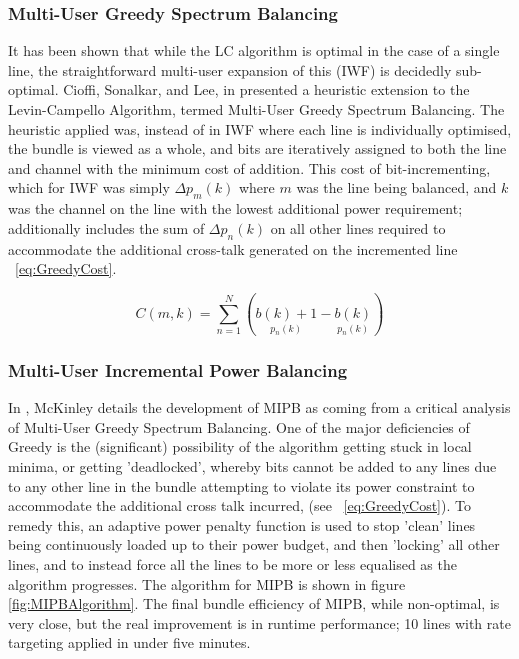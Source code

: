 \subsubsection{Multi-User Greedy Spectrum Balancing}
It has been shown that while the LC algorithm is optimal in the case of a single line, the straightforward multi-user expansion of this (IWF) is decidedly sub-optimal. Cioffi, Sonalkar, and Lee, in \cite{JL05} presented a heuristic extension to the Levin-Campello Algorithm, termed Multi-User Greedy Spectrum Balancing. 
The heuristic applied was, instead of in IWF where each line is individually optimised, the bundle is viewed as a whole, and bits are iteratively assigned to both the line and channel with the minimum cost of addition.
This cost of bit-incrementing, which for IWF was simply \(\Delta p_m(k)\) where \(m\) was the line being balanced, and \(k\) was the channel on the line with the lowest additional power requirement; additionally includes the sum of \(\Delta p_n(k)\) on all other lines required to accommodate the additional cross-talk generated on the incremented line ~\eqref{eq:GreedyCost}.

\begin{equation}
C(m,k)=\sum\limits_{n=1}^N\left(\underset{p_n(k)}{b(k)+1} - \underset{p_n(k)}{b(k)}\right)
\label{eq:GreedyCost}
\end{equation}

\subsubsection{Multi-User Incremental Power Balancing}
In \cite{AM09}, McKinley details the development of MIPB as coming from a critical analysis of Multi-User Greedy Spectrum Balancing. One of the major deficiencies of Greedy is the (significant) possibility of the algorithm getting stuck in local minima, or getting 'deadlocked', whereby bits cannot be added to any lines due to any other line in the bundle attempting to violate  its power constraint to accommodate the additional cross talk incurred, (see ~\ref{eq:GreedyCost}). To remedy this, an adaptive power penalty function is used to stop 'clean' lines being continuously loaded up to their power budget, and then 'locking' all other lines, and to instead force all the lines to be more or less equalised as the algorithm progresses. The algorithm for MIPB is shown in figure \ref{fig:MIPBAlgorithm}. The final bundle efficiency of MIPB, while non-optimal, is very close, but the real improvement is in runtime performance; 10 lines with rate targeting applied in under five minutes.

